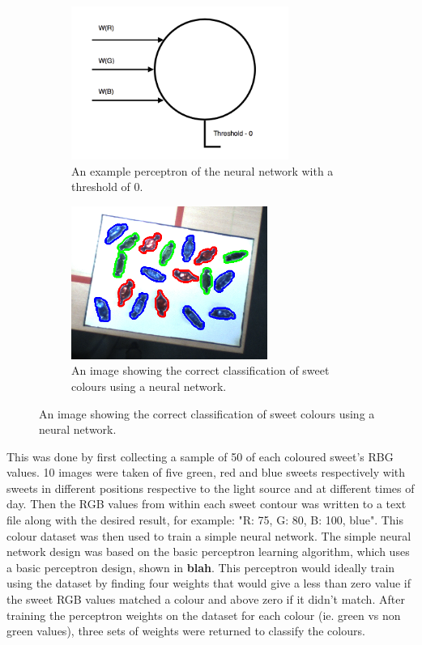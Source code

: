 \begin{figure}[ht!]
    \captionsetup[subfigure]{justification=centering}
    \begin{subfigure}[H]{0.475\textwidth}   
        \centering 
        \includegraphics[width=\textwidth, height=5cm]{neural.png}
        \caption{An example perceptron of the neural network with a threshold of 0.}
        \label{fig:TimeGrasp}
    \end{subfigure}
    \begin{subfigure}[H]{0.475\textwidth}   
        \centering 
        \includegraphics[width=\textwidth, height=5cm]{correctneuralimage.png}
        \caption{An image showing the correct classification of sweet colours using a neural network.}
        \label{fig:TimeGrasp}
    \end{subfigure}
\end{figure}
\newline
This was done by first collecting a sample of 50 of each coloured sweet's RBG values. 10 images were taken of five green, red and blue sweets respectively with sweets in different positions respective to the light source and at different times of day. Then the RGB values from within each sweet contour was written to a text file along with the desired result, for example: "R: 75, G: 80, B: 100, blue". This colour dataset was then used to train a simple neural network. The simple neural network design was based on the basic perceptron learning algorithm, which uses a basic perceptron design, shown in \textbf{blah}. This perceptron would ideally train using the dataset by finding four weights that would give a less than zero value if the sweet RGB values matched a colour and above zero if it didn't match. After training the perceptron weights on the dataset for each colour (ie. green vs non green values), three sets of weights were returned to classify the colours. 
